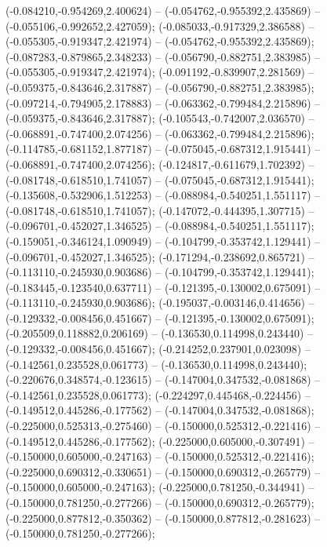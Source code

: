  (-0.084210,-0.954269,2.400624) -- (-0.054762,-0.955392,2.435869) -- (-0.055106,-0.992652,2.427059);
 (-0.085033,-0.917329,2.386588) -- (-0.055305,-0.919347,2.421974) -- (-0.054762,-0.955392,2.435869);
 (-0.087283,-0.879865,2.348233) -- (-0.056790,-0.882751,2.383985) -- (-0.055305,-0.919347,2.421974);
 (-0.091192,-0.839907,2.281569) -- (-0.059375,-0.843646,2.317887) -- (-0.056790,-0.882751,2.383985);
 (-0.097214,-0.794905,2.178883) -- (-0.063362,-0.799484,2.215896) -- (-0.059375,-0.843646,2.317887);
 (-0.105543,-0.742007,2.036570) -- (-0.068891,-0.747400,2.074256) -- (-0.063362,-0.799484,2.215896);
 (-0.114785,-0.681152,1.877187) -- (-0.075045,-0.687312,1.915441) -- (-0.068891,-0.747400,2.074256);
 (-0.124817,-0.611679,1.702392) -- (-0.081748,-0.618510,1.741057) -- (-0.075045,-0.687312,1.915441);
 (-0.135608,-0.532906,1.512253) -- (-0.088984,-0.540251,1.551117) -- (-0.081748,-0.618510,1.741057);
 (-0.147072,-0.444395,1.307715) -- (-0.096701,-0.452027,1.346525) -- (-0.088984,-0.540251,1.551117);
 (-0.159051,-0.346124,1.090949) -- (-0.104799,-0.353742,1.129441) -- (-0.096701,-0.452027,1.346525);
 (-0.171294,-0.238692,0.865721) -- (-0.113110,-0.245930,0.903686) -- (-0.104799,-0.353742,1.129441);
 (-0.183445,-0.123540,0.637711) -- (-0.121395,-0.130002,0.675091) -- (-0.113110,-0.245930,0.903686);
 (-0.195037,-0.003146,0.414656) -- (-0.129332,-0.008456,0.451667) -- (-0.121395,-0.130002,0.675091);
 (-0.205509,0.118882,0.206169) -- (-0.136530,0.114998,0.243440) -- (-0.129332,-0.008456,0.451667);
 (-0.214252,0.237901,0.023098) -- (-0.142561,0.235528,0.061773) -- (-0.136530,0.114998,0.243440);
 (-0.220676,0.348574,-0.123615) -- (-0.147004,0.347532,-0.081868) -- (-0.142561,0.235528,0.061773);
 (-0.224297,0.445468,-0.224456) -- (-0.149512,0.445286,-0.177562) -- (-0.147004,0.347532,-0.081868);
 (-0.225000,0.525313,-0.275460) -- (-0.150000,0.525312,-0.221416) -- (-0.149512,0.445286,-0.177562);
 (-0.225000,0.605000,-0.307491) -- (-0.150000,0.605000,-0.247163) -- (-0.150000,0.525312,-0.221416);
 (-0.225000,0.690312,-0.330651) -- (-0.150000,0.690312,-0.265779) -- (-0.150000,0.605000,-0.247163);
 (-0.225000,0.781250,-0.344941) -- (-0.150000,0.781250,-0.277266) -- (-0.150000,0.690312,-0.265779);
 (-0.225000,0.877812,-0.350362) -- (-0.150000,0.877812,-0.281623) -- (-0.150000,0.781250,-0.277266);
